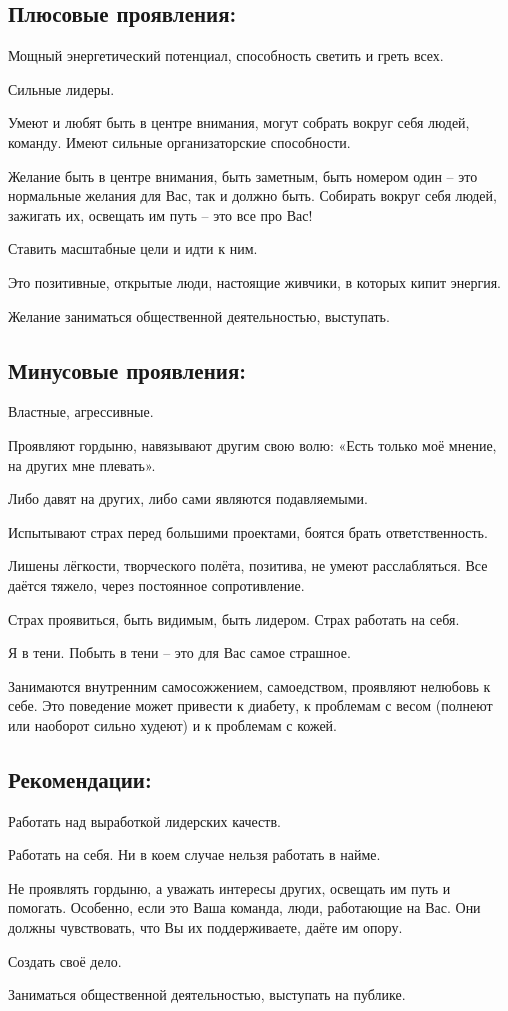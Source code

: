 \subsection{Плюсовые проявления:}
\item Мощный энергетический потенциал, способность светить и греть всех.
\item Сильные лидеры.
\item Умеют и любят быть в центре внимания, могут собрать вокруг себя людей, команду. Имеют сильные организаторские способности.
\item Желание быть в центре внимания, быть заметным, быть номером один – это нормальные желания для Вас, так и должно быть. Собирать вокруг себя людей, зажигать их, освещать им путь – это все про Вас!
\item Ставить масштабные цели и идти к ним.
\item Это позитивные, открытые люди, настоящие живчики, в которых кипит энергия.
\item Желание заниматься общественной деятельностью, выступать.
\endsubsection

\subsection{Минусовые проявления:}
\item Властные, агрессивные.
\item Проявляют гордыню, навязывают другим свою волю: «Есть только моё мнение, на других мне плевать».
\item Либо давят на других, либо сами являются подавляемыми.
\item Испытывают страх перед большими проектами, боятся брать ответственность.
\item Лишены лёгкости, творческого полёта, позитива, не умеют расслабляться. Все даётся тяжело, через постоянное сопротивление.
\item Страх проявиться, быть видимым, быть лидером. Страх работать на себя.
\item Я в тени. Побыть в тени – это для Вас самое страшное.
\item Занимаются внутренним самосожжением, самоедством, проявляют нелюбовь к себе. Это поведение может привести к диабету, к проблемам с весом (полнеют или наоборот сильно худеют) и к проблемам с кожей.
\endsubsection

\subsection{Рекомендации:}
\item Работать над выработкой лидерских качеств.
\item Работать на себя. Ни в коем случае нельзя работать в найме.
\item Не проявлять гордыню, а уважать интересы других, освещать им путь и помогать. Особенно, если это Ваша команда, люди, работающие на Вас. Они должны чувствовать, что Вы их поддерживаете, даёте им опору.
\item Создать своё дело.
\item Заниматься общественной деятельностью, выступать на публике.
\endsubsection

